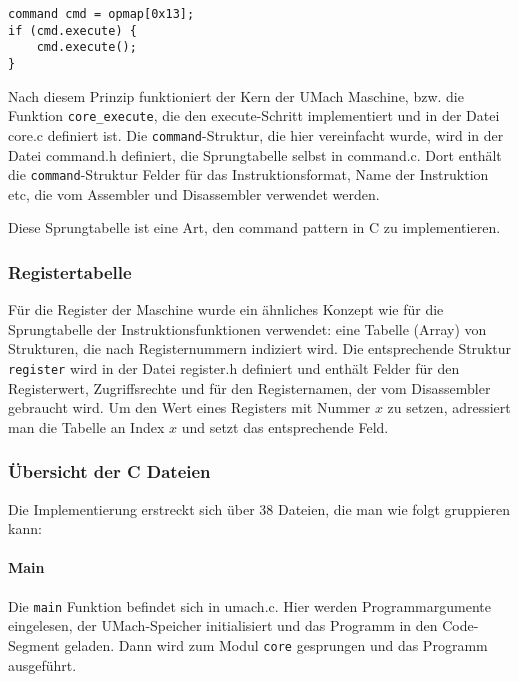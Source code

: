 \begin{lstlisting}
command cmd = opmap[0x13];
if (cmd.execute) {
    cmd.execute();
}
\end{lstlisting}

Nach diesem Prinzip funktioniert der Kern der UMach Maschine, bzw. die Funktion
\texttt{core\_execute}, die den \glqq{}execute\grqq{}-Schritt implementiert und
in der Datei core.c definiert ist. Die \texttt{command}-Struktur, die hier
vereinfacht wurde, wird in der Datei command.h definiert, die Sprungtabelle
selbst in command.c. Dort enthält die \texttt{command}-Struktur Felder für das
Instruktionsformat, Name der Instruktion etc, die vom Assembler und Disassembler
verwendet werden.

Diese Sprungtabelle ist eine Art, den \glqq{}command pattern\grqq{} in C zu
implementieren.


\subsubsection{Registertabelle}

Für die Register der Maschine wurde ein ähnliches Konzept wie für die
Sprungtabelle der Instruktionsfunktionen verwendet: eine Tabelle (Array) von
Strukturen, die nach Registernummern indiziert wird. Die entsprechende Struktur
\texttt{register} wird in der Datei register.h definiert und enthält Felder für
den Registerwert, Zugriffsrechte und für den Registernamen, der vom Disassembler
gebraucht wird. Um den Wert eines Registers mit Nummer $x$ zu setzen, adressiert
man die Tabelle an Index $x$ und setzt das entsprechende Feld.



\subsubsection{Übersicht der C Dateien}
\label{sec:umach-uebersicht-c-dateien}

Die Implementierung erstreckt sich über 38 Dateien, die man wie folgt
gruppieren kann:

\paragraph{Main}
Die \texttt{main} Funktion befindet sich in umach.c. Hier werden
Programmargumente eingelesen, der UMach-Speicher initialisiert und das Programm
in den Code-Segment geladen. Dann wird zum Modul \texttt{core} gesprungen und
das Programm ausgeführt.

